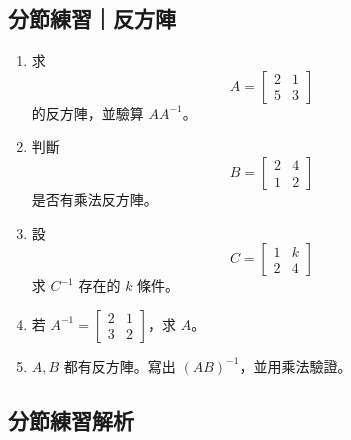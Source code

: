 \documentclass[11pt,a4paper]{article}
\begin{document}
\subsection{分節練習｜反方陣}\label{ux5206ux7bc0ux7df4ux7fd2ux53cdux65b9ux9663}

\begin{enumerate}
\def\labelenumi{\arabic{enumi}.}
\item
  求
  \[A=\begin{bmatrix}2&1\\5&3\end{bmatrix}\]
  的反方陣，並驗算 \(AA^{-1}\)。
\item
  判斷
  \[B=\begin{bmatrix}2&4\\1&2\end{bmatrix}\]
  是否有乘法反方陣。
\item
  設
  \[C=\begin{bmatrix}1&k\\2&4\end{bmatrix}\]
  求 \(C^{-1}\) 存在的 \(k\) 條件。
\item
  若 \(A^{-1}=\begin{bmatrix}2&1\\3&2\end{bmatrix}\)，求 \(A\)。
\item
  \(A,B\) 都有反方陣。寫出 \((AB)^{-1}\)，並用乘法驗證。
\end{enumerate}

\subsection{分節練習解析}\label{ux5206ux7bc0ux7df4ux7fd2ux89e3ux6790-4}
\end{document}
